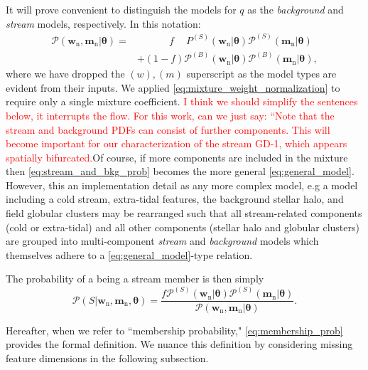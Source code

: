 \documentclass[twocolumn]{aastex631}
\newcommand{\stream}[1]{#1}
\newcommand{\mrm}[1]{\mathrm{#1}}
\newcommand{\mbs}[1]{\boldsymbol{#1}}
\newcommand{\mcal}[1]{\mathcal{#1}}
\newcommand{\pdf}{\mcal{P}}
\newcommand{\nth}[1]{{#1}_{\mrm{n}}}  %
\newcommand{\smallcomponent}[2]{#2^{\scriptscriptstyle (#1)}}
\newcommand{\cmp}[2]{\smallcomponent{#1}{#2}}
\newcommand{\Scmp}[1]{\cmp{S}{#1}}
\newcommand{\Bcmp}[1]{\cmp{B}{#1}}
\newcommand{\Spdf}{\Scmp{\pdf}}
\newcommand{\Bpdf}{\Bcmp{\pdf}}
\newcommand{\TODO}[1]{{\textcolor{red}{#1}}}
\newcommand{\JN}[1]{\TODO{#1}}
\begin{document}
        It will prove convenient to distinguish the models for $q$ as the
        \textit{background} and \textit{stream} models, respectively. In this
        notation:
        \begin{align} \label{eq:stream_and_bkg_prob}
            \pdf(\nth{\mbs{w}}, \nth{\mbs{m}} | \mbs{\theta})
            =& \phantom{+} \qquad f \phantom{+} \Scmp{P}(\nth{\mbs{w}}|\mbs{\theta}) \Spdf(\nth{\mbs{m}}|\mbs{\theta}) \\
            & + (1-f) \Bpdf(\nth{\mbs{w}}|\mbs{\theta}) \Bpdf(\nth{\mbs{m}}|\mbs{\theta}), \nonumber
        \end{align}
        where we have dropped the $(w), (m)$ superscript as the model types are
        evident from their inputs. We applied
        \autoref{eq:mixture_weight_normalization} to require only a single
        mixture coefficient.  \JN{I think we should simplify the sentences below, it interrupts the flow. For this work, can we just say: ``Note that the stream and background PDFs can consist of further components. This will become important for our characterization of the stream \stream{GD-1}, which appears spatially bifurcated.}Of course, if more components are included in the
        mixture then \autoref{eq:stream_and_bkg_prob} becomes the more general
        \autoref{eq:general_model}. However, this an implementation detail as
        any more complex model, e.g a model including a cold stream, extra-tidal
        features, the background stellar halo, and field globular clusters may
        be rearranged such that all stream-related components (cold or
        extra-tidal) and all other components (stellar halo and globular
        clusters) are grouped into multi-component \textit{stream} and
        \textit{background} models which themselves adhere to a
        \autoref{eq:general_model}-type relation.

        The probability of a being a stream member is then simply
        \begin{equation}\label{eq:membership_prob}
            \pdf\left(S | \nth{\mbs{w}}, \nth{\mbs{m}}, \mbs{\theta} \right)
            = \frac{f \Spdf(\nth{\mbs{w}}|\mbs{\theta}) \Spdf(\nth{\mbs{m}}|\mbs{\theta}) }{ \pdf(\nth{\mbs{w}}, \nth{\mbs{m}} | \mbs{\theta})}.
        \end{equation}

        Hereafter, when we refer to ``membership probability,"
        \autoref{eq:membership_prob} provides the formal definition. We nuance
        this definition by considering missing feature dimensions in the
        following subsection.
\end{document}
